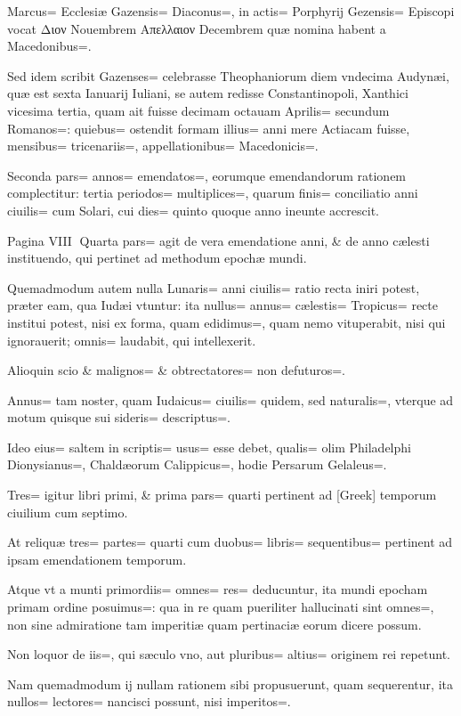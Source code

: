 \begin{parnumbers}
Marcus= Ecclesiæ Gazensis= Diaconus=, in actis= Porphyrij Gezensis= Episcopi vocat Διον Nouembrem Απελλαιον Decembrem quæ nomina habent a Macedonibus=. 

Sed idem scribit Gazenses= celebrasse Theophaniorum diem vndecima Audynæi, quæ est sexta Ianuarij Iuliani, se autem redisse Constantinopoli, Xanthici vicesima tertia, quam ait fuisse decimam octauam Aprilis= secundum Romanos=: quiebus= ostendit formam illius= anni mere Actiacam fuisse, mensibus= tricenariis=, appellationibus= Macedonicis=. 

Seconda pars= annos= emendatos=, eorumque emendandorum rationem complectitur: tertia periodos= multiplices=, quarum finis= conciliatio anni ciuilis= cum Solari, cui dies= quinto quoque anno ineunte accrescit.

Pagina VIII
Quarta pars= agit de vera emendatione anni, \& de anno cælesti instituendo, qui pertinet ad methodum epochæ mundi.

Quemadmodum autem nulla Lunaris= anni ciuilis= ratio recta iniri potest, præter eam, qua Iudæi vtuntur: ita nullus= annus= cælestis= Tropicus= recte institui potest, nisi ex forma, quam edidimus=, quam nemo vituperabit, nisi qui ignorauerit; omnis= laudabit, qui intellexerit.

Alioquin scio \& malignos= \& obtrectatores= non defuturos=. 

Annus= tam noster, quam Iudaicus= ciuilis= quidem, sed naturalis=, vterque ad motum quisque sui sideris= descriptus=. 

Ideo eius= saltem in scriptis= usus= esse debet, qualis= olim Philadelphi Dionysianus=, Chaldæorum Calippicus=, hodie Persarum Gelaleus=. 

Tres= igitur libri primi, \& prima pars= quarti pertinent ad [Greek] temporum ciuilium cum septimo.

At reliquæ tres= partes= quarti cum duobus= libris= sequentibus= pertinent ad ipsam emendationem temporum.

Atque vt a munti primordiis= omnes= res= deducuntur, ita mundi epocham primam ordine posuimus=: qua in re quam pueriliter hallucinati sint omnes=, non sine admiratione tam imperitiæ quam pertinaciæ eorum dicere possum.

Non loquor de iis=, qui sæculo vno, aut pluribus= altius= originem rei repetunt.

Nam quemadmodum ij nullam rationem sibi propusuerunt, quam sequerentur, ita nullos= lectores= nancisci possunt, nisi imperitos=. 


\end{parnumbers}

